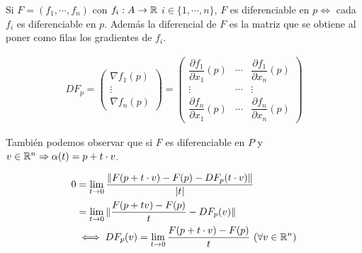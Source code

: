Si \(F = (f_1, \cdots, f_n)\) con \(f_i: A \to \mathbb{R}\) \(i \in \{1, \cdots, n\}\), \(F\) es diferenciable en \(p \iff\) cada \(f_i\) es diferenciable en \(p\).
Además la diferencial de \(F\) es la matriz que se obtiene al poner como filas los gradientes de \(f_i\).

\begin{align*}
  DF_p = \begin{pmatrix}
           \nabla f_1(p) \\
           \vdots        \\
           \nabla f_n(p)
         \end{pmatrix} = \begin{pmatrix}
                           \dfrac{\partial f_1}{\partial x_1}(p) & \cdots & \dfrac{\partial f_1}{\partial x_n}(p) \\
                           \vdots                                & \cdots & \vdots                                \\
                           \dfrac{\partial f_n}{\partial x_1}(p) & \cdots & \dfrac{\partial f_n}{\partial x_n}(p)
                         \end{pmatrix}
\end{align*}

También podemos observar que si \(F\) es diferenciable en \(P\) y \(v \in \mathbb{R}^n \Rightarrow \alpha(t) = p + t \cdot v\).

\begin{align*}
  0 & = \lim_{t \to 0} \dfrac{\| F(p + t \cdot v) - F(p) - DF_p(t \cdot v) \|}{|t|}                 \\
    & = \lim_{t \to 0} \| \dfrac{F(p + tv) - F(p)}{t} - DF_p(v) \|                                  \\
    & \iff DF_p(v) = \lim_{t \to 0} \dfrac{F(p+t \cdot v) - F(p)}{t} \text{  } (\forall v \in \mathbb{R}^n)
\end{align*}

